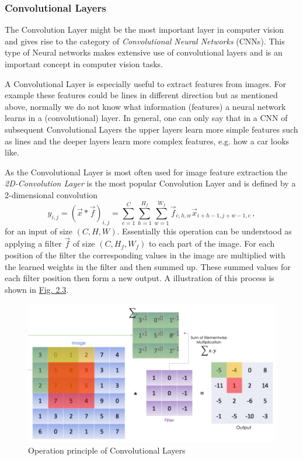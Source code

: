 \subsubsection{Convolutional Layers}
The Convolution Layer might be the most important layer in computer vision and gives rise to the category of \textit{Convolutional Neural Networks} (CNNs). This type of Neural networks makes extensive use of convolutional layers and is an important concept in computer vision tasks.

A Convolutional Layer is especially useful to extract features from images. For example these features could be lines in different direction but as mentioned above, normally we do not know what information (features) a neural network learns in a (convolutional) layer. In general, one can only say that in a CNN of subsequent Convolutional Layers the upper layers learn more simple features such as lines and the deeper layers learn more complex features, e.g. how a car looks like.

As the Convolutional Layer is most often used for image feature extraction the \textit{2D-Convolution Layer} is the most popular Convolution Layer and is defined by a 2-dimensional convolution
%
\begin{equation}
    y_{i,j}=(\vec{x}\ast\vec{f})_{i,j}=\sum_{c=1}^{C}\sum_{h=1}^{H_f}\sum_{w=1}^{W_f}\vec{f}_{c,h,w}\vec{x}_{i+h-1,j+w-1,c}\,,
\end{equation}
%
for an input of size $(C,H,W)$. Essentially this operation can be understood as applying a filter $\vec{f}$ of size $(C, H_f, W_f)$ to each part of the image. For each position of the filter the corresponding values in the image are multiplied with the learned weights in the filter and then summed up. These summed values for each filter position then form a new output. A illustration of this process is shown in \hyperref[fig:2.3]{Fig. 2.3}.
%
\begin{figure} \label{fig:2.3}
    \centering
    \includegraphics[width=.65\textwidth]{Chapters/figures/convolution.PNG}
    \caption{Operation principle of Convolutional Layers}
\end{figure}
%

